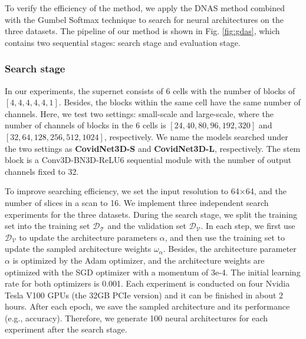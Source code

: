 \documentclass[letterpaper]{article}
\begin{document}
To verify the efficiency of the method, we apply the DNAS method combined with the Gumbel Softmax technique to search for neural architectures on the three datasets. The pipeline of our method is shown in Fig. \ref{fig:gdas}, which contains two sequential stages: search stage and evaluation stage.

\subsubsection{Search stage}

In our experiments, the supernet consists of 6 cells with the number of blocks of $[4,4,4,4,4,1]$. Besides, the blocks within the same cell have the same number of channels. Here, we test two settings: small-scale and large-scale, where the number of channels of blocks in the 6 cells is $[24, 40, 80, 96, 192, 320]$ and $[32, 64, 128, 256, 512, 1024]$, respectively. We name the models searched under the two settings as \textbf{CovidNet3D-S} and \textbf{CovidNet3D-L}, respectively. The stem block is a Conv3D-BN3D-ReLU6 sequential module with the number of output channels fixed to 32.

To improve searching efficiency, we set the input resolution to 64$\times$64, and the number of slices in a scan to 16. We implement three independent search experiments for the three datasets. During the search stage, we split the training set into the training set $\mathcal{D_T}$ and the validation set $\mathcal{D_V}$. In each step, we first use $\mathcal{D_V}$ to update the architecture parameters $\alpha$, and then use the training set to update the sampled architecture weights $\omega_\alpha$. Besides, the architecture parameter $\alpha$ is optimized by the Adam \cite{adam} optimizer, and the architecture weights are optimized with the SGD optimizer with a momentum of 3e-4. The initial learning rate for both optimizers is 0.001.  Each experiment is conducted on four Nvidia Tesla V100 GPUs (the 32GB PCIe version) and it can be finished in about 2 hours. After each epoch, we save the sampled architecture and its performance (e.g., accuracy). Therefore, we generate 100 neural architectures for each experiment after the search stage.
\end{document}

